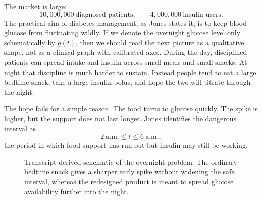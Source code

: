 The market is large:
\begin{equation}
10{,}000{,}000\ \text{diagnosed patients},
\qquad
4{,}000{,}000\ \text{insulin users}.
\end{equation}
The practical aim of diabetes management, as Jones states it, is to keep blood glucose from fluctuating wildly. If we denote the overnight glucose level only schematically by \(g(t)\), then we should read the next picture as a qualitative shape, not as a clinical graph with calibrated axes. During the day, disciplined patients can spread intake and insulin across small meals and small snacks. At night that discipline is much harder to sustain. Instead people tend to eat a large bedtime snack, take a large insulin bolus, and hope the two will titrate through the night.

The hope fails for a simple reason. The food turns to glucose quickly. The spike is higher, but the support does not last longer. Jones identifies the dangerous interval as
\begin{equation}
2\ \text{a.m.}\le t\le 6\ \text{a.m.},
\end{equation}
the period in which food support has run out but insulin may still be working.

\begin{figure}
\centering
{}
\caption{Transcript-derived schematic of the overnight problem. The ordinary bedtime snack gives a sharper early spike without widening the safe interval, whereas the redesigned product is meant to spread glucose availability further into the night.}
\end{figure}

